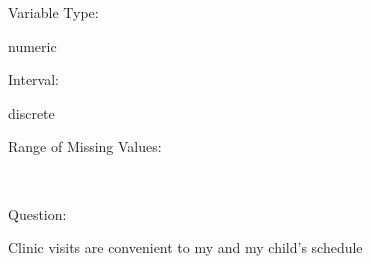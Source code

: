 \documentclass[
]{article}
\begin{document}
\begin{minipage}[t]{0.3\linewidth}

Variable Type:

\end{minipage}%
\begin{minipage}[t]{0.7\linewidth}

numeric

\end{minipage}

\begin{minipage}[t]{0.3\linewidth}

Interval:

\end{minipage}%
\begin{minipage}[t]{0.7\linewidth}

discrete

\end{minipage}

\begin{minipage}[t]{0.3\linewidth}

Range of Missing Values:

\end{minipage}%
\begin{minipage}[t]{0.7\linewidth}

~

\end{minipage}

\begin{minipage}[t]{0.3\linewidth}

Question:

\end{minipage}%
\begin{minipage}[t]{0.7\linewidth}

Clinic visits are convenient to my and my child's schedule

\end{minipage}
\end{document}
